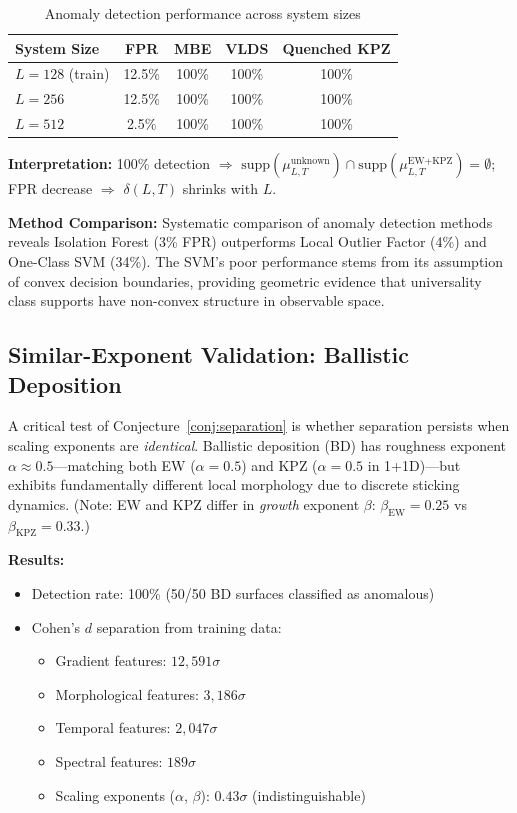 \documentclass[aps,pre,reprint,amsmath,amssymb,superscriptaddress]{revtex4-2}
\newcommand{\EW}{\text{EW}}
\newcommand{\KPZ}{\text{KPZ}}
\newcommand{\supp}{\text{supp}}
\begin{document}
\begin{table}[h]
\centering
\caption{Anomaly detection performance across system sizes}
\label{tab:detection}
\begin{tabular}{lcccc}
\toprule
System Size & FPR & MBE & VLDS & Quenched KPZ \\
\midrule
$L=128$ (train) & 12.5\% & 100\% & 100\% & 100\% \\
$L=256$ & 12.5\% & 100\% & 100\% & 100\% \\
$L=512$ & 2.5\% & 100\% & 100\% & 100\% \\
\bottomrule
\end{tabular}
\end{table}

\textbf{Interpretation:} 100\% detection $\Rightarrow$ $\supp(\mu^{\text{unknown}}_{L,T}) \cap \supp(\mu^{\EW+\KPZ}_{L,T}) = \emptyset$; FPR decrease $\Rightarrow$ $\delta(L,T)$ shrinks with $L$.

\textbf{Method Comparison:} Systematic comparison of anomaly detection methods reveals Isolation Forest (3\% FPR) outperforms Local Outlier Factor (4\%) and One-Class SVM (34\%). The SVM's poor performance stems from its assumption of convex decision boundaries, providing geometric evidence that universality class supports have non-convex structure in observable space.

\subsection{Similar-Exponent Validation: Ballistic Deposition}

A critical test of Conjecture~\ref{conj:separation} is whether separation persists when scaling exponents are \emph{identical}. Ballistic deposition (BD) has roughness exponent $\alpha \approx 0.5$---matching both EW ($\alpha = 0.5$) and KPZ ($\alpha = 0.5$ in 1+1D)---but exhibits fundamentally different local morphology due to discrete sticking dynamics. (Note: EW and KPZ differ in \emph{growth} exponent $\beta$: $\beta_{\text{EW}} = 0.25$ vs $\beta_{\text{KPZ}} = 0.33$.)

\textbf{Results:}
\begin{itemize}
\item Detection rate: 100\% (50/50 BD surfaces classified as anomalous)
\item Cohen's $d$ separation from training data:
\begin{itemize}
\item Gradient features: $12{,}591\sigma$
\item Morphological features: $3{,}186\sigma$
\item Temporal features: $2{,}047\sigma$
\item Spectral features: $189\sigma$
\item Scaling exponents ($\alpha$, $\beta$): $0.43\sigma$ (indistinguishable)
\end{itemize}
\end{itemize}
\end{document}
